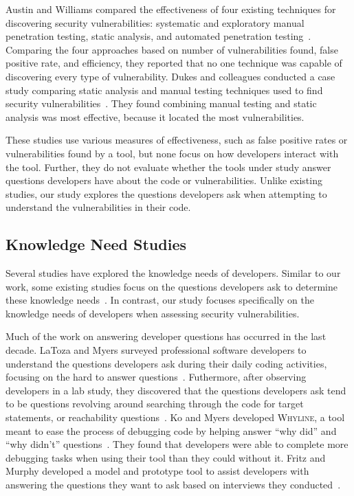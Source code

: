 \documentclass{acm_proc_article-sp}
\begin{document}
Austin and Williams compared the effectiveness of four existing techniques for discovering security vulnerabilities: systematic and exploratory manual  penetration testing, static analysis, and automated penetration testing~\cite{austin2011one}. 
Comparing the four approaches based on number of vulnerabilities found, false positive rate, and efficiency, they reported that no one technique was capable of discovering every type of vulnerability. 
Dukes and colleagues conducted a case study comparing static analysis and manual testing techniques used to find security vulnerabilities~\cite{dukes2013case}. 
They found combining manual testing and static analysis was most effective, because it located the most vulnerabilities.

These studies use various measures of effectiveness, such as false positive rates or vulnerabilities found by a tool, but none focus on how developers interact with the tool. 
Further, they do not evaluate whether the tools under study answer questions developers have about the code or vulnerabilities. 
Unlike existing studies, our study explores the questions developers ask when attempting to understand the vulnerabilities in their code.

\subsection{Knowledge Need Studies}
\label{questions}
Several studies have explored the knowledge needs of developers.
Similar to our work, some existing studies focus on the questions developers ask to determine these knowledge needs~\cite{latoza2010hard, latoza2010developers}.
In contrast, our study focuses specifically on the knowledge needs of developers when assessing security vulnerabilities.


Much of the work on answering developer questions has occurred in the last decade. 
LaToza and Myers surveyed professional software developers to understand the questions developers ask during their daily coding activities, focusing on the hard to answer questions~\cite{latoza2010hard}. 
Futhermore, after observing developers in a lab study, they discovered that the questions developers ask tend to be questions revolving around searching through the code for target statements, or reachability questions~\cite{latoza2010developers}. 
Ko and Myers developed \textsc{Whyline}, a tool meant to ease the process of debugging code by helping answer ``why did'' and ``why didn't'' questions~\cite{ko2004designing}. 
They found that developers were able to complete more debugging tasks when using their tool than they could without it.
Fritz and Murphy developed a model and prototype tool to assist developers with answering the questions they want to ask based on interviews they conducted~\cite{fritz2010using}.
\end{document}
